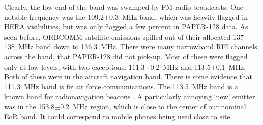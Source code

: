 Clearly, the low-end of the band was swamped by FM radio broadcasts. One notable frequency was the 109.2$\pm$0.3~MHz band, which was heavily flagged in HERA visibilities, but was only flagged a few percent in PAPER-128 data.
As seen before, ORBCOMM satellite emissions spilled out of their allocated 137-138~MHz band down to 136.3~MHz.
There were many narrowband RFI channels, across the band, that PAPER-128 did not pick-up. Most of these were flagged only at low levels, with two exceptions: 111.3$\pm$0.2~MHz and 113.5$\pm$0.1~MHz. Both of these were in the aircraft navigation band. There is some evidence \citep{airforce} that 111.3~MHz band is fir air force communications. The 113.5~MHz band is a known band for radionavigation beacons \citep[`VOR navaids'][]{navaid}.
A particularly annoying `new' emitter was in the 153.8$\pm$0.2~MHz region, which is close to the center of our nominal EoR band. It could correspond to mobile phones being used close to site.

